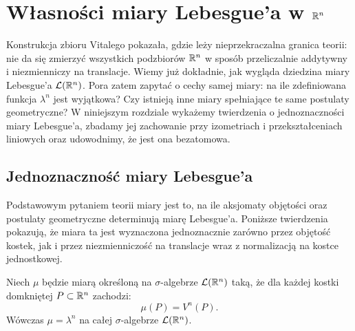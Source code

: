 \section{Własności miary Lebesgue'a w $\mathbb{R}^{n}$}

Konstrukcja zbioru Vitalego pokazała, gdzie leży nieprzekraczalna granica teorii: nie da się zmierzyć wszystkich podzbiorów $\mathbb{R}^{n}$ w sposób przeliczalnie addytywny i niezmienniczy na translacje. Wiemy już dokładnie, jak wygląda dziedzina miary Lebesgue'a $\mathcal{L}({\mathbb{R}^{n}})$. Pora zatem zapytać o cechy samej miary: na ile zdefiniowana funkcja $\lambda^n$ jest wyjątkowa? Czy istnieją inne miary spełniające te same postulaty geometryczne? W niniejszym rozdziale wykażemy twierdzenia o jednoznaczności miary Lebesgue'a, zbadamy jej zachowanie przy izometriach i przekształceniach liniowych oraz udowodnimy, że jest ona bezatomowa.

\subsection{Jednoznaczność miary Lebesgue'a}

Podstawowym pytaniem teorii miary jest to, na ile aksjomaty objętości oraz postulaty geometryczne determinują miarę Lebesgue'a. Poniższe twierdzenia pokazują, że miara ta jest wyznaczona jednoznacznie zarówno przez objętość kostek, jak i przez niezmienniczość na translacje wraz z normalizacją na kostce jednostkowej.

\begin{tw}\label{tw:jednoznacznosc_kostki}
    Niech $\mu$ będzie miarą określoną na $\sigma$-algebrze $\mathcal{L}({\mathbb{R}^{n}})$ taką, że dla każdej kostki domkniętej $P \subset \mathbb{R}^{n}$ zachodzi:
    \begin{equation}
        \mu(P) = V^n(P).
    \end{equation}
    Wówczas $\mu = \lambda^n$ na całej $\sigma$-algebrze $\mathcal{L}({\mathbb{R}^{n}})$.
\end{tw}


